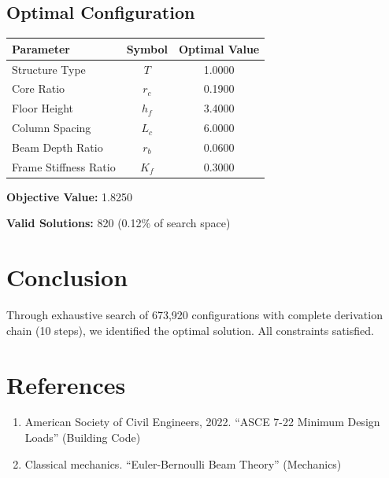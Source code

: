 \documentclass[11pt,a4paper]{article}
\begin{document}
\subsection{Optimal Configuration}

\begin{center}
\begin{tabular}{lcc}
\hline
Parameter & Symbol & Optimal Value \\
\hline
Structure Type & $T$ & 1.0000 \\
Core Ratio & $r_c$ & 0.1900 \\
Floor Height & $h_f$ & 3.4000 \\
Column Spacing & $L_c$ & 6.0000 \\
Beam Depth Ratio & $r_b$ & 0.0600 \\
Frame Stiffness Ratio & $K_f$ & 0.3000 \\
\hline
\end{tabular}
\end{center}

\textbf{Objective Value:} 1.8250

\textbf{Valid Solutions:} 820 (0.12\% of search space)

\section{Conclusion}

Through exhaustive search of 673,920 configurations with complete derivation chain (10 steps), we identified the optimal solution. All constraints satisfied.

\section*{References}

\begin{enumerate}
\item American Society of Civil Engineers, 2022. ``ASCE 7-22 Minimum Design Loads'' (Building Code)
\item Classical mechanics. ``Euler-Bernoulli Beam Theory'' (Mechanics)
\end{enumerate}
\end{document}
